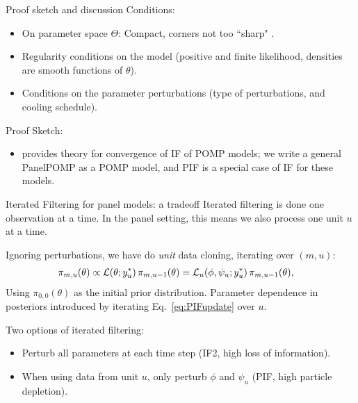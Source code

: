 \documentclass[aspectratio=169]{beamer}\usepackage[]{graphicx}\usepackage[]{xcolor}
\begin{document}
\begin{frame}{Proof sketch and discussion}
  Conditions:
  \begin{itemize}
    \item On parameter space $\Theta$: Compact, corners not too ``sharp" \citep[regular compact set, Def~1 of][]{chen24}.
    \item Regularity conditions on the model (positive and finite likelihood, densities are smooth functions of $\theta$). 
    \item Conditions on the parameter perturbations (type of perturbations, and cooling schedule). 
  \end{itemize}
  Proof Sketch: 
  \begin{itemize}
    \item \citet{chen24} provides theory for convergence of IF of POMP models; we write a general PanelPOMP as a POMP model, and PIF is a special case of IF for these models. 
  \end{itemize}
\end{frame}

\begin{frame}{Iterated Filtering for panel models: a tradeoff}
  Iterated filtering is done one observation at a time. 
  In the panel setting, this means we also process one unit $u$ at a time.
  
  Ignoring perturbations, we have do \emph{unit} data cloning, iterating over $(m, u)$: 
  \begin{align}
    \pi_{m, u}(\theta) &\propto \mathcal{L}(\theta; y_u^*)\, \pi_{m, u-1}(\theta) = \mathcal{L}_u(\phi, \psi_u; y_u^*)\, \pi_{m, u-1}(\theta), \label{eq:PIFupdate}
  \end{align}
    Using $\pi_{0, 0}(\theta)$ as the initial prior distribution. Parameter dependence in posteriors introduced by iterating Eq.~\ref{eq:PIFupdate} over $u$.
    
    Two options of iterated filtering: 
    \begin{itemize}
      \item Perturb all parameters at each time step (IF2, high loss of information). 
      \item When using data from unit $u$, only perturb $\phi$ and $\psi_u$ (PIF, high particle depletion). 
    \end{itemize}
\end{frame}
\end{document}
